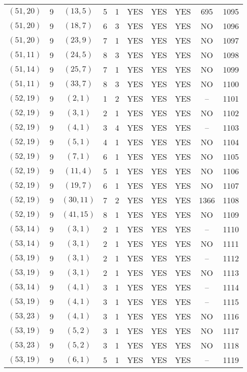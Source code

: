 \begin{longtable}{|c|c|c|c|c|c|c|c|c|c|}
$(51, 20)$ & 9 & $(13, 5)$ & 5 & 1 & YES & YES & YES & 695 & 1095\\
$(51, 20)$ & 9 & $(18, 7)$ & 6 & 3 & YES & YES & YES & NO & 1096\\
$(51, 20)$ & 9 & $(23, 9)$ & 7 & 1 & YES & YES & YES & NO & 1097\\
$(51, 11)$ & 9 & $(24, 5)$ & 8 & 3 & YES & YES & YES & NO & 1098\\
$(51, 14)$ & 9 & $(25, 7)$ & 7 & 1 & YES & YES & YES & NO & 1099\\
$(51, 11)$ & 9 & $(33, 7)$ & 8 & 3 & YES & YES & YES & NO & 1100\\
$(52, 19)$ & 9 & $(2, 1)$ & 1 & 2 & YES & YES & YES & -- & 1101\\
$(52, 19)$ & 9 & $(3, 1)$ & 2 & 1 & YES & YES & YES & NO & 1102\\
$(52, 19)$ & 9 & $(4, 1)$ & 3 & 4 & YES & YES & YES & -- & 1103\\
$(52, 19)$ & 9 & $(5, 1)$ & 4 & 1 & YES & YES & YES & NO & 1104\\
$(52, 19)$ & 9 & $(7, 1)$ & 6 & 1 & YES & YES & YES & NO & 1105\\
$(52, 19)$ & 9 & $(11, 4)$ & 5 & 1 & YES & YES & YES & NO & 1106\\
$(52, 19)$ & 9 & $(19, 7)$ & 6 & 1 & YES & YES & YES & NO & 1107\\
$(52, 19)$ & 9 & $(30, 11)$ & 7 & 2 & YES & YES & YES & 1366 & 1108\\
$(52, 19)$ & 9 & $(41, 15)$ & 8 & 1 & YES & YES & YES & NO & 1109\\
$(53, 14)$ & 9 & $(3, 1)$ & 2 & 1 & YES & YES & YES & -- & 1110\\
$(53, 14)$ & 9 & $(3, 1)$ & 2 & 1 & YES & YES & YES & NO & 1111\\
$(53, 19)$ & 9 & $(3, 1)$ & 2 & 1 & YES & YES & YES & -- & 1112\\
$(53, 19)$ & 9 & $(3, 1)$ & 2 & 1 & YES & YES & YES & NO & 1113\\
$(53, 14)$ & 9 & $(4, 1)$ & 3 & 1 & YES & YES & YES & -- & 1114\\
$(53, 19)$ & 9 & $(4, 1)$ & 3 & 1 & YES & YES & YES & -- & 1115\\
$(53, 23)$ & 9 & $(4, 1)$ & 3 & 1 & YES & YES & YES & NO & 1116\\
$(53, 19)$ & 9 & $(5, 2)$ & 3 & 1 & YES & YES & YES & NO & 1117\\
$(53, 23)$ & 9 & $(5, 2)$ & 3 & 1 & YES & YES & YES & NO & 1118\\
$(53, 19)$ & 9 & $(6, 1)$ & 5 & 1 & YES & YES & YES & -- & 1119\\

\end{longtable}
